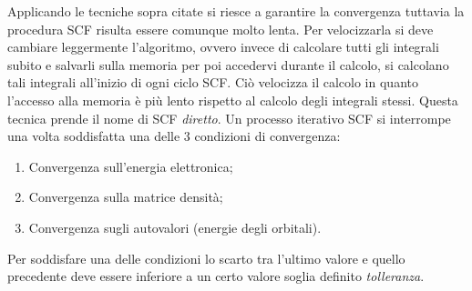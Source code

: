 \documentclass[oneside]{amsbook}
\numberwithin{section}{chapter}
\numberwithin{equation}{section}
\numberwithin{figure}{section}
\begin{document}
Applicando le tecniche sopra citate si riesce a garantire la convergenza tuttavia la procedura SCF risulta essere comunque molto lenta. Per velocizzarla si deve cambiare leggermente l'algoritmo, ovvero invece di calcolare tutti gli integrali subito e salvarli sulla memoria per poi accedervi durante il calcolo, si calcolano tali integrali all'inizio di ogni ciclo SCF. Ciò  velocizza il calcolo in quanto l'accesso alla memoria è più lento rispetto al calcolo degli integrali stessi. Questa tecnica prende il nome di SCF \emph{diretto}.
Un processo iterativo SCF si interrompe una volta soddisfatta una delle $3$ condizioni di convergenza:
\begin{enumerate}
\item Convergenza sull'energia elettronica;
\item Convergenza sulla matrice densità;
\item Convergenza sugli autovalori (energie degli orbitali).
\end{enumerate}
Per soddisfare una delle condizioni lo scarto tra l'ultimo valore e quello precedente deve essere inferiore a un certo valore soglia definito \emph{tolleranza}.
\end{document}

